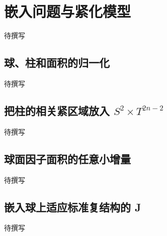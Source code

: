 
% 
% 

\section{嵌入问题与紧化模型}
\label{g4:sec:2401}

待撰写

\subsection{球、柱和面积的归一化}
\label{g4:subsec:2401:01}
待撰写

\subsection{\texorpdfstring{把柱的相关紧区域放入 \(S^2\times T^{2n-2}\)}{把柱的相关紧区域放入 S²×T²ⁿ⁻²}}
\label{g4:subsec:2401:02}
待撰写

\subsection{球面因子面积的任意小增量}
\label{g4:subsec:2401:03}
待撰写

\subsection{嵌入球上适应标准复结构的 J}
\label{g4:subsec:2401:04}
待撰写
